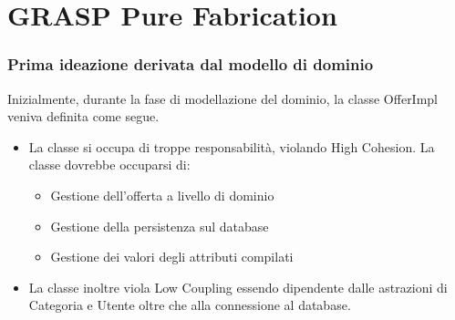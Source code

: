 \section{GRASP Pure Fabrication}

\begin{frame}
    \frametitle{Prima ideazione derivata dal modello di dominio}
    Inizialmente, durante la fase di modellazione del dominio, la classe OfferImpl veniva definita come segue.

    \begin{minipage}{.29\textwidth}
        \begin{figure}
            \centering
        \end{figure}
    \end{minipage}
    \begin{minipage}{.68\textwidth}
        \begin{itemize}
            \item<1-> La classe si occupa di troppe responsabilità, violando High Cohesion. La classe dovrebbe occuparsi di:
            \begin{itemize}
                \item Gestione dell'offerta a livello di dominio
                \item Gestione della persistenza sul database
                \item Gestione dei valori degli attributi compilati
            \end{itemize}
            \item<2-> La classe inoltre viola Low Coupling essendo dipendente dalle astrazioni di Categoria e Utente oltre che alla connessione al database.
        \end{itemize}
    \end{minipage}
\end{frame}

